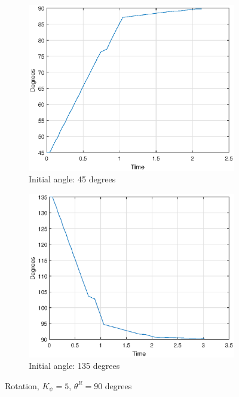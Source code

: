 \begin{figure}[H]
   
    \begin{subfigure}[b]{7cm}
        \includegraphics[width=\textwidth]{rotation_p45.eps}
        \caption{Initial angle: 45 degrees}
        \label{fig:45deg}
    \end{subfigure}
     \begin{subfigure}[b]{7cm}
        \includegraphics[width=\textwidth]{rotation_p135.eps}
        \caption{Initial angle: 135 degrees}
        \label{fig:135deg}
    \end{subfigure}
    \caption{Rotation, $K_\psi=5$, $\theta^R=90$ degrees}\label{fig:animals}
    \label{fig:dir-ctrl}
\end{figure}

